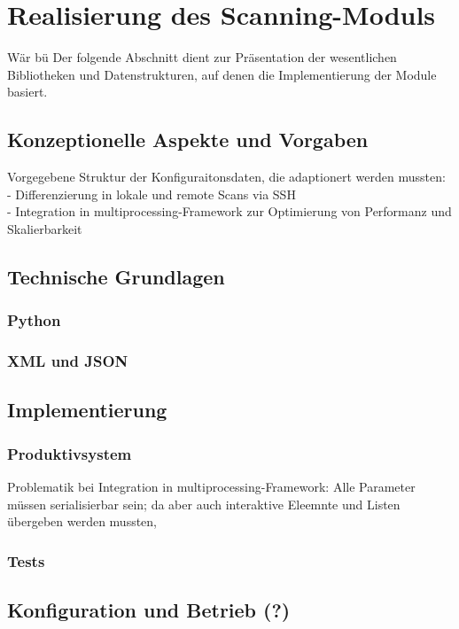 ﻿\chapter{Realisierung des Scanning-Moduls}
Wär bü
	Der folgende Abschnitt dient zur Präsentation der wesentlichen Bibliotheken und Datenstrukturen, auf denen die Implementierung der Module basiert.

	\section{Konzeptionelle Aspekte und Vorgaben}
		Vorgegebene Struktur der Konfiguraitonsdaten, die adaptionert werden mussten:\\
		- Differenzierung in lokale und remote Scans via SSH\\
		- Integration in multiprocessing-Framework zur Optimierung von Performanz und Skalierbarkeit\\	
			  
		

	\section{Technische Grundlagen}
		\subsection{Python}
		\subsection{XML und JSON}
		
	\section{Implementierung}
		\subsection{Produktivsystem}
			Problematik bei Integration in multiprocessing-Framework:
			Alle Parameter müssen serialisierbar sein; da aber auch interaktive Eleemnte und Listen übergeben werden mussten,
		\subsection{Tests}
		
	\section{Konfiguration und Betrieb (?)}	
